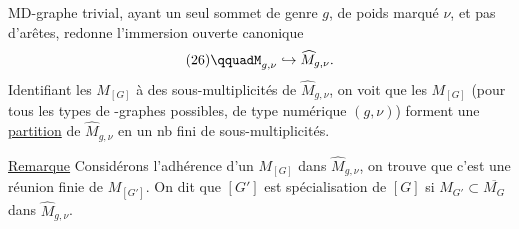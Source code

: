 MD-graphe trivial, ayant un seul sommet de genre $g$, de poids marqué $\nu$, et pas d'arêtes, redonne l'immersion ouverte canonique
\[
(26)\qquadM_{g,\nu}\hookrightarrow\widehat{M}_{g,\nu}.
\]
Identifiant les $M_{[G]}$ à des sous-multiplicités de $\widehat{M}_{g,\nu}$, on voit que les $M_{[G]}$ (pour tous les types de -graphes possibles, de type numérique $(g,\nu)$) forment une \uline{partition} de $\widehat{M}_{g,\nu}$ en un nb fini de sous-multiplicités.

\uline{Remarque} Considérons l'adhérence d'un $M_{[G]}$ dans $\widehat{M}_{g,\nu}$, on trouve que c'est une réunion finie de $M_{[G']}$. On dit que $[G']$ est spécialisation de $[G]$ si $M_{G'}\subset\overline{M_G}$ dans $\widehat{M}_{g,\nu}$.
